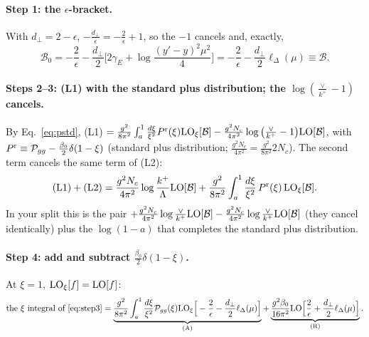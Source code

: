 \documentclass[10pt]{article}
\numberwithin{equation}{section}
\newcommand{\LO}{{\rm LO}}
\begin{document}
\paragraph{Step 1: the $\epsilon$-bracket.} With $d_\perp=2-\epsilon$, $-\frac{d_\perp}{\epsilon}=-\frac2\epsilon+1$, so the $-1$ cancels and, exactly,
\begin{equation}
\mathcal B_0=-\frac{2}{\epsilon}-\frac{d_\perp}{2}\Big[2\gamma_E+\log\frac{(y'-y)^2\mu^2}{4}\Big]=-\frac2\epsilon-\frac{d_\perp}{2}\ell_\Delta(\mu)\equiv\mathcal B.\label{eq:B}
\end{equation}
\paragraph{Steps 2--3: (L1) with the standard plus distribution; the $\log(\frac{\vee}{k^+}-1)$ cancels.} By Eq.~\eqref{eq:pstd}, (L1) $=\frac{g^2}{8\pi^2}\int_a^1\frac{d\xi}{\xi^2}P^{\rm r}(\xi)\LO_\xi[\mathcal B]-\frac{g^2N_c}{4\pi^2}\log\big(\frac{\vee}{k^+}-1\big)\LO[\mathcal B]$, with $P^{\rm r}\equiv\mathcal P_{gg}-\frac{\beta_0}{2}\delta(1-\xi)$ (standard plus distribution; $\frac{g^2N_c}{4\pi^2}=\frac{g^2}{8\pi^2}2N_c$). The second term cancels the same term of (L2):
\begin{equation}
\text{(L1)}+\text{(L2)}=\frac{g^2N_c}{4\pi^2}\log\frac{k^+}{\Lambda}\LO[\mathcal B]+\frac{g^2}{8\pi^2}\int_a^1\frac{d\xi}{\xi^2}\,P^{\rm r}(\xi)\,\LO_\xi[\mathcal B].\label{eq:step3}
\end{equation}
In your split this is the pair $+\frac{g^2N_c}{4\pi^2}\log\frac{\vee}{k^+}\LO[\mathcal B]-\frac{g^2N_c}{4\pi^2}\log\frac{\vee}{k^+}\LO[\mathcal B]$ (they cancel identically) plus the $\log(1-a)$ that completes the standard plus distribution.
\paragraph{Step 4: add and subtract $\frac{\beta_0}{2}\delta(1-\xi)$.} At $\xi=1$, $\LO_\xi[f]=\LO[f]$:
\begin{equation}
\text{the }\xi\text{ integral of }\eqref{eq:step3}=\underbrace{\frac{g^2}{8\pi^2}\int_a^1\frac{d\xi}{\xi^2}\mathcal P_{gg}(\xi)\LO_\xi\Big[-\frac2\epsilon-\frac{d_\perp}{2}\ell_\Delta(\mu)\Big]}_{\rm (A)}+\underbrace{\frac{g^2\beta_0}{16\pi^2}\LO\Big[\frac2\epsilon+\frac{d_\perp}{2}\ell_\Delta(\mu)\Big]}_{\rm (R)}.
\end{equation}
\end{document}
